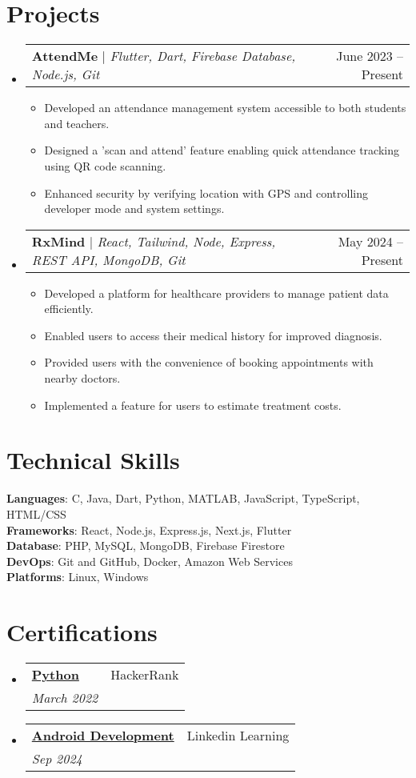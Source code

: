 \documentclass[letterpaper,11pt]{article}
\makeatletter
\newcommand{\resumeItem}[1]{
  \item\small{
    {#1 \vspace{-2pt}}
  }
}
\newcommand{\resumeSubheading}[4]{
  \vspace{-2pt}\item
    \begin{tabular*}{0.97\textwidth}[t]{l@{\extracolsep{\fill}}r}
      \textbf{#1} & #2 \\
      \textit{\small#3} & \textit{\small #4} \\
    \end{tabular*}\vspace{-7pt}
}
\newcommand{\resumeProjectHeading}[2]{
    \item
    \begin{tabular*}{0.97\textwidth}{l@{\extracolsep{\fill}}r}
      \small#1 & #2 \\
    \end{tabular*}\vspace{-7pt}
}
\newcommand{\resumeSubHeadingListStart}{\begin{itemize}[leftmargin=0.15in, label={}]}
\newcommand{\resumeSubHeadingListEnd}{\end{itemize}}
\newcommand{\resumeItemListStart}{\begin{itemize}}
\newcommand{\resumeItemListEnd}{\end{itemize}\vspace{-5pt}}
\makeatother
\begin{document}
\section{Projects}
  \resumeSubHeadingListStart
    \resumeProjectHeading
        {\textbf{AttendMe} $|$ \emph{Flutter, Dart, Firebase Database, Node.js, Git}}{June 2023 -- Present}
        \resumeItemListStart
          \resumeItem{Developed an attendance management system accessible to both students and teachers.}
          \resumeItem{Designed a 'scan and attend' feature enabling quick attendance tracking using QR code scanning.}
          \resumeItem{Enhanced security by verifying location with GPS and controlling developer mode and system settings.}
        \resumeItemListEnd
    \resumeProjectHeading
        {\textbf{RxMind} $|$ \emph{React, Tailwind, Node, Express, REST API, MongoDB, Git}}{May 2024 -- Present}
        \resumeItemListStart
          \resumeItem{Developed a platform for healthcare providers to manage patient data efficiently.}
          \resumeItem{Enabled users to access their medical history for improved diagnosis.}
          \resumeItem{Provided users with the convenience of booking appointments with nearby doctors.}
          \resumeItem{Implemented a feature for users to estimate treatment costs.}
        \resumeItemListEnd
  \resumeSubHeadingListEnd

\section{Technical Skills}
 \begin{itemize}[leftmargin=0.15in, label={}]
    \small{\item{
     \textbf{Languages}{: C, Java, Dart, Python, MATLAB, JavaScript, TypeScript, HTML/CSS} \\
     \textbf{Frameworks}{: React, Node.js, Express.js, Next.js, Flutter} \\ 
     \textbf{Database}{: PHP, MySQL, MongoDB, Firebase Firestore} \\ 
     \textbf{DevOps}{: Git and GitHub, Docker, Amazon Web Services} \\
     \textbf{Platforms}{: Linux, Windows}
    }}
 \end{itemize}

\section{Certifications}
  \resumeSubHeadingListStart
    \resumeSubheading
      {\href{https://www.hackerrank.com/certificates/dd8f41e196fa} {Python}}{HackerRank}{March 2022}{}
    \resumeSubheading
      {\href{https://www.linkedin.com/learning/certificates/f1ad0fee7918badf79380b7ca9f8150092891eb43e30236ca0efa3602884c9bd?u=229219690}{Android Development}}
      {Linkedin Learning}{Sep 2024}{}
  \resumeSubHeadingListEnd

\end{document}
